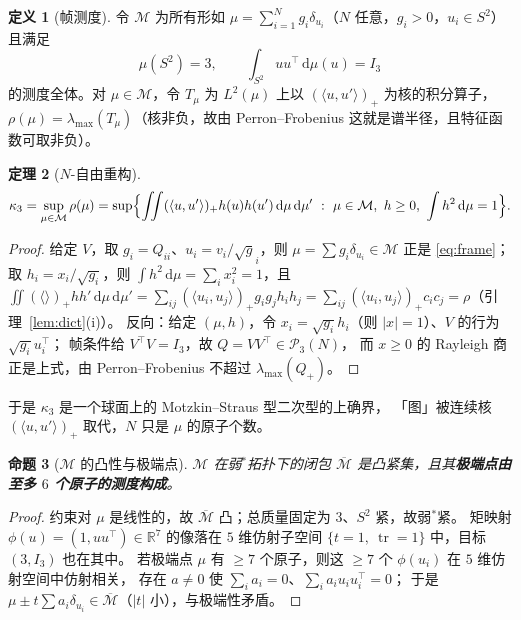 \documentclass[UTF8,11pt]{ctexart}
\newtheorem{theorem}{定理}[section]
\newtheorem{proposition}[theorem]{命题}
\theoremstyle{definition}
\newtheorem{definition}[theorem]{定义}
\newcommand{\tr}{\operatorname{tr}}
\newcommand{\dd}{\,\mathrm{d}}
\newcommand{\R}{\mathbb{R}}
\begin{document}
\begin{definition}[帧测度]\label{def:framemeas}
令 $\mathcal M$ 为所有形如 $\mu=\sum_{i=1}^Ng_i\delta_{u_i}$（$N$ 任意，$g_i>0$，$u_i\in S^2$）
且满足
\[
\mu(S^2)=3,\qquad \int_{S^2}uu^\top\dd\mu(u)=I_3
\]
的测度全体。对 $\mu\in\mathcal M$，令 $T_\mu$ 为 $L^2(\mu)$ 上以 $(\langle u,u'\rangle)_+$ 为核的积分算子，
$\rho(\mu)=\lambda_{\max}(T_\mu)$（核非负，故由 Perron--Frobenius 这就是谱半径，且特征函数可取非负）。
\end{definition}

\begin{theorem}[$N$-自由重构]\label{thm:nfree}
\[
\kappa_3=\sup_{\mu\in\mathcal M}\rho(\mu)
=\sup\Bigl\{\iint(\langle u,u'\rangle)_+h(u)h(u')\dd\mu\dd\mu'\ :\ \mu\in\mathcal M,\ h\ge0,\ \int h^2\dd\mu=1\Bigr\}.
\]
\end{theorem}

\begin{proof}
给定 $V$，取 $g_i=Q_{ii}$、$u_i=v_i/\sqrt g_i$，则 $\mu=\sum g_i\delta_{u_i}\in\mathcal M$
正是 \eqref{eq:frame}；取 $h_i=x_i/\sqrt{g_i}$，则 $\int h^2\dd\mu=\sum_ix_i^2=1$，且
$\iint(\langle\rangle)_+hh'\dd\mu\dd\mu'=\sum_{ij}(\langle u_i,u_j\rangle)_+g_ig_jh_ih_j
=\sum_{ij}(\langle u_i,u_j\rangle)_+c_ic_j=\rho$（引理~\ref{lem:dict}(i)）。
反向：给定 $(\mu,h)$，令 $x_i=\sqrt{g_i}h_i$（则 $|x|=1$）、$V$ 的行为 $\sqrt{g_i}u_i^\top$；
帧条件给 $V^\top V=I_3$，故 $Q=VV^\top\in\mathcal P_3(N)$，
而 $x\ge0$ 的 Rayleigh 商正是上式，由 Perron--Frobenius 不超过 $\lambda_{\max}(Q_+)$。
\end{proof}

于是 $\kappa_3$ 是一个球面上的 Motzkin--Straus 型二次型的上确界，
「图」被连续核 $(\langle u,u'\rangle)_+$ 取代，$N$ 只是 $\mu$ 的原子个数。

\begin{proposition}[$\mathcal M$ 的凸性与极端点]\label{prop:extreme}
$\mathcal M$ 在弱$^*$拓扑下的闭包 $\overline{\mathcal M}$ 是凸紧集，且其\textbf{极端点由至多 $6$ 个原子的测度构成}。
\end{proposition}

\begin{proof}
约束对 $\mu$ 是线性的，故 $\overline{\mathcal M}$ 凸；总质量固定为 $3$、$S^2$ 紧，故弱$^*$紧。
矩映射 $\phi(u)=(1,uu^\top)\in\R^7$ 的像落在 $5$ 维仿射子空间
$\{t=1,\ \tr=1\}$ 中，目标 $(3,I_3)$ 也在其中。
若极端点 $\mu$ 有 $\ge7$ 个原子，则这 $\ge7$ 个 $\phi(u_i)$ 在 $5$ 维仿射空间中仿射相关，
存在 $a\ne0$ 使 $\sum_ia_i=0$、$\sum_ia_iu_iu_i^\top=0$；
于是 $\mu\pm t\sum a_i\delta_{u_i}\in\overline{\mathcal M}$（$|t|$ 小），与极端性矛盾。
\end{proof}
\end{document}
